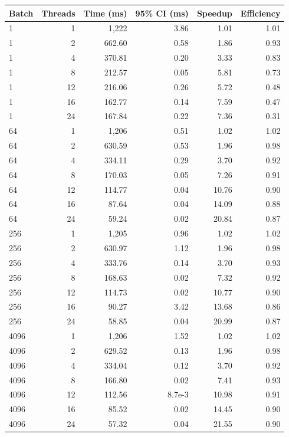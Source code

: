 \begin{tabular}{lrrrrr}
\toprule
Batch & Threads & Time (ms) & 95\% CI (ms) & Speedup & Efficiency \\
\midrule
1 & 1 & 1,222 & 3.86 & 1.01 & 1.01 \\
1 & 2 & 662.60 & 0.58 & 1.86 & 0.93 \\
1 & 4 & 370.81 & 0.20 & 3.33 & 0.83 \\
1 & 8 & 212.57 & 0.05 & 5.81 & 0.73 \\
1 & 12 & 216.06 & 0.26 & 5.72 & 0.48 \\
1 & 16 & 162.77 & 0.14 & 7.59 & 0.47 \\
1 & 24 & 167.84 & 0.22 & 7.36 & 0.31 \\
64 & 1 & 1,206 & 0.51 & 1.02 & 1.02 \\
64 & 2 & 630.59 & 0.53 & 1.96 & 0.98 \\
64 & 4 & 334.11 & 0.29 & 3.70 & 0.92 \\
64 & 8 & 170.03 & 0.05 & 7.26 & 0.91 \\
64 & 12 & 114.77 & 0.04 & 10.76 & 0.90 \\
64 & 16 & 87.64 & 0.04 & 14.09 & 0.88 \\
64 & 24 & 59.24 & 0.02 & 20.84 & 0.87 \\
256 & 1 & 1,205 & 0.96 & 1.02 & 1.02 \\
256 & 2 & 630.97 & 1.12 & 1.96 & 0.98 \\
256 & 4 & 333.76 & 0.14 & 3.70 & 0.93 \\
256 & 8 & 168.63 & 0.02 & 7.32 & 0.92 \\
256 & 12 & 114.73 & 0.02 & 10.77 & 0.90 \\
256 & 16 & 90.27 & 3.42 & 13.68 & 0.86 \\
256 & 24 & 58.85 & 0.04 & 20.99 & 0.87 \\
4096 & 1 & 1,206 & 1.52 & 1.02 & 1.02 \\
4096 & 2 & 629.52 & 0.13 & 1.96 & 0.98 \\
4096 & 4 & 334.04 & 0.12 & 3.70 & 0.92 \\
4096 & 8 & 166.80 & 0.02 & 7.41 & 0.93 \\
4096 & 12 & 112.56 & 8.7e-3 & 10.98 & 0.91 \\
4096 & 16 & 85.52 & 0.02 & 14.45 & 0.90 \\
4096 & 24 & 57.32 & 0.04 & 21.55 & 0.90 \\
\bottomrule
\end{tabular}
